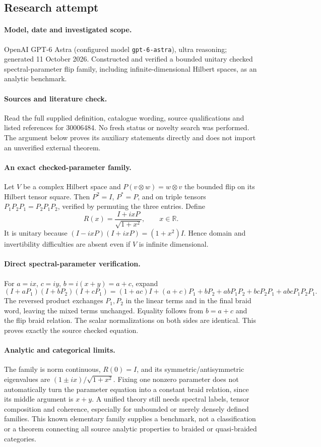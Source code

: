 \documentclass[11pt]{article}
\begin{document}
\subsection{Research attempt}
\paragraph{Model, date and investigated scope.}
OpenAI GPT-6 Astra (configured model \texttt{gpt-6-astra}), ultra reasoning; generated 11 October 2026. Constructed and verified a bounded unitary checked spectral-parameter flip family, including infinite-dimensional Hilbert spaces, as an analytic benchmark.

\paragraph{Sources and literature check.}
Read the full supplied definition, catalogue wording, source qualifications and listed references for 30006484. No fresh status or novelty search was performed. The argument below proves its auxiliary statements directly and does not import an unverified external theorem.

\paragraph{An exact checked-parameter family.} Let \(V\) be a complex Hilbert space and \(P(v\otimes w)=w\otimes v\) the bounded flip on its Hilbert tensor square. Then \(P^2=I\), \(P^*=P\), and on triple tensors \(P_1P_2P_1=P_2P_1P_2\), verified by permuting the three entries. Define
\[
 R(x)=\frac{I+ixP}{\sqrt{1+x^2}},\qquad x\in\mathbb R.
\]
It is unitary because \((I-ixP)(I+ixP)=(1+x^2)I\). Hence domain and invertibility difficulties are absent even if \(V\) is infinite dimensional.
\paragraph{Direct spectral-parameter verification.} For \(a=ix\), \(c=iy\), \(b=i(x+y)=a+c\), expand
\[
 (I+aP_1)(I+bP_2)(I+cP_1)
 =(1+ac)I+(a+c)P_1+bP_2
 +abP_1P_2+bcP_2P_1+abcP_1P_2P_1.
\]
The reversed product exchanges \(P_1,P_2\) in the linear terms and in the final braid word, leaving the mixed terms unchanged. Equality follows from \(b=a+c\) and the flip braid relation. The scalar normalizations on both sides are identical. This proves exactly the source checked equation.
\paragraph{Analytic and categorical limits.} The family is norm continuous, \(R(0)=I\), and its symmetric/antisymmetric eigenvalues are \((1\pm ix)/\sqrt{1+x^2}\). Fixing one nonzero parameter does not automatically turn the parameter equation into a constant braid relation, since its middle argument is \(x+y\). A unified theory still needs spectral labels, tensor composition and coherence, especially for unbounded or merely densely defined families. This known elementary family supplies a benchmark, not a classification or a theorem connecting all source analytic properties to braided or quasi-braided categories.
\end{document}
